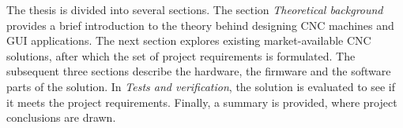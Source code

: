 The thesis is divided into several sections. The section \textit{Theoretical
background} provides a brief introduction to the theory behind designing CNC
machines and GUI applications. The next section explores existing
market-available CNC solutions, after which the set of project requirements is
formulated. The subsequent three sections describe the hardware, the firmware
and the software parts of the solution. In \textit{Tests and verification}, the
solution is evaluated to see if it meets the project requirements. Finally, a
summary is provided, where project conclusions are drawn.
